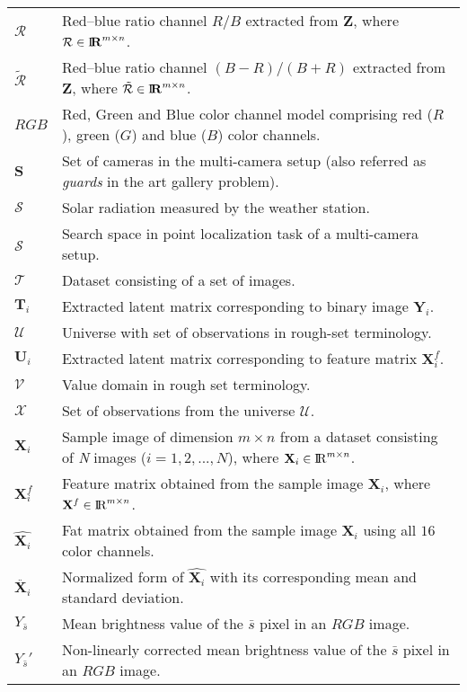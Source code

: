 \begin{longtable}[l]{p{80pt}p{320pt}}
$\mathcal{R}$ & Red--blue ratio channel $R/B$ extracted from $\mathbf{Z}$, where $\mathcal{R} \in {\rm I\!\mathbf{R}}^{m \times n}$.\\
$\tilde{\mathcal{R}}$ & Red--blue ratio channel $(B-R)/(B+R)$ extracted from $\mathbf{Z}$, where $\tilde{\mathcal{R}} \in {\rm I\!\mathbf{R}}^{m \times n}$.\\
$RGB$ & Red, Green and Blue color channel model comprising red ($R$), green ($G$) and blue ($B$) color channels. \\
$\mathbf{S}$ & Set of cameras in the multi-camera setup (also referred as \emph{guards} in the art gallery problem). \\
$\mathcal{S}$ & Solar radiation measured by the weather station. \\
$\hat{\mathcal{S}}$ & Search space in point localization task of a multi-camera setup.\\ 
$\mathcal{T}$ & Dataset consisting of a set of images. \\
$\mathbf{T}_{i}$ & Extracted latent matrix corresponding to binary image $\mathbf{Y}_{i}$. \\
$\mathcal{U}$ & Universe with set of observations in rough-set terminology. \\
$\mathbf{U}_{i}$ & Extracted latent matrix corresponding to feature matrix $\mathbf{X}^{f}_{i}$. \\
$\mathcal{V}$ & Value domain in rough set terminology. \\
$\mathcal{X}$ & Set of observations from the universe $\mathcal{U}$. \\
$\mathbf{X}_{i}$ & Sample image of dimension $m \times n$ from a dataset consisting of \emph{N} images ($i=1,2,...,N$), where $\mathbf{X}_{i} \in {\rm I\!R}^{m \times n}$. \\
$\mathbf{X}^{f}_{i}$ & Feature matrix obtained from the sample image $\mathbf{X}_{i}$, where $\mathbf{X}^{f} \in {\rm I\!R}^{m \times n}$. \\
$\hat{\textbf{X}_{i}}$ & Fat matrix obtained from the sample image $\mathbf{X}_{i}$ using all $16$ color channels. \\
$\ddot{\mathbf{X}_{i}}$ & Normalized form of $\hat{\textbf{X}_{i}}$ with its corresponding mean and standard deviation. \\
$Y_{\bar{s}}$ & Mean brightness value of the $\bar{s}$ pixel in an $RGB$ image. \\
$Y_{\bar{s}}'$ & Non-linearly corrected mean brightness value of the $\bar{s}$ pixel in an $RGB$ image. \\

\end{longtable}
